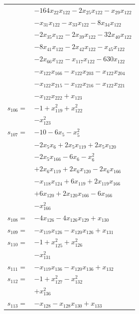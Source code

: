 \begin{longtable}{@{}r@{\;}l@{}}
 & \(\displaystyle -164x_{22}x_{122} -2x_{25}x_{122} -x_{29}x_{122}\) \\
 & \(\displaystyle -x_{31}x_{122} -x_{33}x_{122} -8x_{34}x_{122}\) \\
 & \(\displaystyle -2x_{35}x_{122} -2x_{39}x_{122} -32x_{40}x_{122}\) \\
 & \(\displaystyle -8x_{41}x_{122} -2x_{42}x_{122} -x_{45}x_{122}\) \\
 & \(\displaystyle -2x_{66}x_{122} -x_{117}x_{122} -630x_{122}\) \\
 & \(\displaystyle -x_{122}x_{166} -x_{122}x_{203} -x_{122}x_{204}\) \\
 & \(\displaystyle -x_{122}x_{215} -x_{122}x_{216} -x_{122}x_{221}\) \\
 & \(\displaystyle -x_{122}x_{222} +x_{123}\) \\[3pt]
\(s_{106}=\) & \(\displaystyle -1 +x_{119}^{2} +x_{122}^{2}\) \\
 & \(\displaystyle -x_{123}^{2}\) \\[3pt]
\(s_{107}=\) & \(\displaystyle -10 -6x_{5} -x_{5}^{2}\) \\
 & \(\displaystyle -2x_{5}x_{6} +2x_{5}x_{119} +2x_{5}x_{120}\) \\
 & \(\displaystyle -2x_{5}x_{166} -6x_{6} -x_{6}^{2}\) \\
 & \(\displaystyle +2x_{6}x_{119} +2x_{6}x_{120} -2x_{6}x_{166}\) \\
 & \(\displaystyle -x_{118}x_{124} +6x_{119} +2x_{119}x_{166}\) \\
 & \(\displaystyle +6x_{120} +2x_{120}x_{166} -6x_{166}\) \\
 & \(\displaystyle -x_{166}^{2}\) \\[3pt]
\(s_{108}=\) & \(\displaystyle -4x_{126} -4x_{126}x_{129} +x_{130}\) \\[3pt]
\(s_{109}=\) & \(\displaystyle -x_{119}x_{126} -x_{120}x_{126} +x_{131}\) \\[3pt]
\(s_{110}=\) & \(\displaystyle -1 +x_{125}^{2} +x_{126}^{2}\) \\
 & \(\displaystyle -x_{131}^{2}\) \\[3pt]
\(s_{111}=\) & \(\displaystyle -x_{119}x_{136} -x_{120}x_{136} +x_{132}\) \\[3pt]
\(s_{112}=\) & \(\displaystyle -1 +x_{127}^{2} -x_{132}^{2}\) \\
 & \(\displaystyle +x_{136}^{2}\) \\[3pt]
\(s_{113}=\) & \(\displaystyle -x_{128} -x_{128}x_{130} +x_{133}\) \\[3pt]

\end{longtable}
